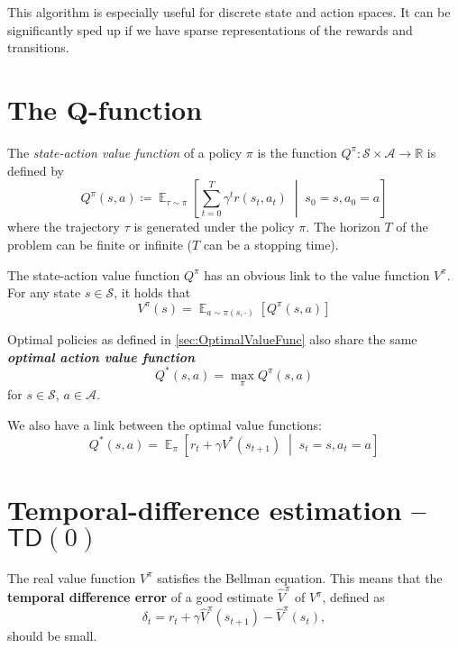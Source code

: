 \documentclass[12pt]{report}
\newcommand\RR{\mathbb{R}}
\newcommand{\scalemid}{\;\middle|\;}
\DeclareMathOperator{\EE}{\mathbb{E}}
\newcommand{\calA}{\mathcal{A}}
\newcommand{\calS}{\mathcal{S}}
\newcommand{\bluefont}{\color{Blue}}
\begin{document}
This algorithm is especially useful for discrete state and action spaces. It can be significantly sped up if we have sparse representations of the rewards and transitions.


\section{The $\boldsymbol{Q}$-function}



\begin{defn}
	The \textit{state-action value function} of a policy $\pi$ is the function $Q^\pi\colon \calS\times\calA\to \RR$ is defined by
	\begin{equation}
	Q^\pi(s, a) \coloneqq \EE_{\tau\sim \pi}
	\left[
	\sum_{t=0}^T \gamma^t r(s_t, a_t) \scalemid s_0 = s, a_0 = a
	\right]
	\end{equation}
	where the trajectory $\tau$ is generated under the policy $\pi$.
	The horizon $T$ of the problem can be finite or infinite ($T$ can be a stopping time).
\end{defn}



The state-action value function $Q^\pi$ has an obvious link to the value function $V^\pi$.
For any state $s\in\calS$, it holds that
\begin{equation}\label{eq:ValueFunctionExpectationLink}
	V^\pi(s) = \EE_{a\sim \pi(s,\cdot)}\left[
	Q^\pi(s, a)
	\right]
\end{equation}

\begin{defn}
Optimal policies as defined in \cref{sec:OptimalValueFunc} also share the same \emph{\bfseries\bluefont optimal action value function}
\begin{equation}
	Q^*(s,a) = \max_\pi Q^\pi(s,a)
\end{equation}
for $s\in\calS$, $a\in\calA$.	
\end{defn}

We also have a link between the optimal value functions:
\[
	Q^*(s,a) = \EE_\pi\left[
	r_t + \gamma V^*(s_{t+1}) \scalemid
	s_t=s, a_t=a
	\right]
\]



\section{Temporal-difference estimation -- $\mathsf{TD}(0)$}

The real value function $V^\pi$ satisfies the Bellman equation. This means that the \textbf{\bluefont temporal difference error} of a good estimate $\widehat{V}^\pi$ of $V^\pi$, defined as
\[
	\delta_t = r_t + \gamma \widehat{V}^\pi(s_{t+1}) - \widehat{V}^\pi(s_t),
\]
should be small.








\nocite{*}
\printbibliography
\end{document}
